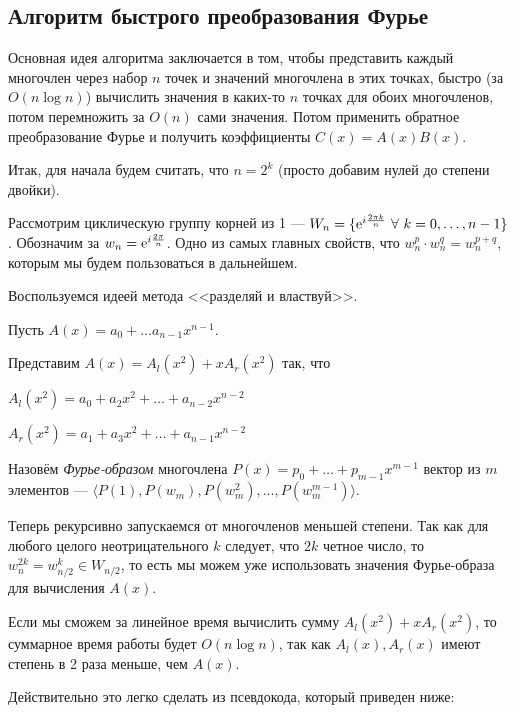 \documentclass[a4paper, 12pt]{article}
\begin{document}
\subsection{Алгоритм быстрого преобразования Фурье}

Основная идея алгоритма заключается в том, чтобы представить каждый многочлен
через набор $n$ точек и значений многочлена в этих точках, быстро (за $O(n\log n)$) вычислить значения в каких-то $n$ точках для обоих многочленов, потом
перемножить за $O(n)$ сами значения. Потом применить обратное преобразование
Фурье и получить коэффициенты $C(x) = A(x)B(x)$.

Итак, для начала будем считать, что $n = 2^k$ (просто добавим нулей до степени двойки).

Рассмотрим циклическую группу корней из 1 --- $W_n = \{\e^{i\frac{2\pi k}{n}} \ 
\forall \ k = 0, \ldots, n - 1\}$. Обозначим за $w_n = \mathrm{e}^{i\frac{2\pi}{n}}$.
Одно из самых главных свойств, что $w_n^{p} \cdot w_n^{q} = w_n^{p + q}$,
которым мы будем пользоваться в дальнейшем.

Воспользуемся идеей метода <<разделяй и властвуй>>.

Пусть $A(x) = a_0 + \ldots a_{n - 1}x^{n - 1}$.

Представим $A(x) = A_l(x^2) + xA_r(x^2)$ так, что

\begin{center}
  $A_l(x^2) = a_0 + a_2x^2 + \ldots + a_{n - 2}x^{n - 2}$

  $A_r(x^2) = a_1 + a_3x^2 + \ldots + a_{n - 1}x^{n - 2}$
\end{center}

\begin{Def}
  \rm{Назовём \textit{Фурье-образом} многочлена $P(x) = p_0 + \ldots + 
  p_{m - 1}x^{m - 1}$ вектор из $m$ элементов ---  $\langle P(1), P(w_m), P(w_m^2), \ldots, P(w_m^{m - 1}) \rangle$.}
\end{Def}

Теперь рекурсивно запускаемся от многочленов меньшей степени. Так как для 
любого целого неотрицательного $k$ следует, что $2k$ четное число, то $w_n^{2k} = w_{n/2}^k \in W_{n/2}$,
то есть мы можем уже использовать значения Фурье-образа для вычисления $A(x)$.

Если мы сможем за линейное время вычислить сумму $A_l(x^2) + xA_r(x^2)$, то
суммарное время работы будет $O(n\log n)$, так как $A_l(x), A_r(x)$ имеют степень
в 2 раза меньше, чем $A(x)$.

Действительно это легко сделать из псевдокода, который приведен ниже:
\end{document}
